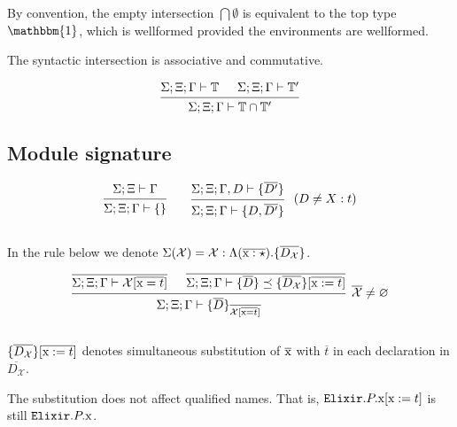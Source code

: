 \documentclass[12pt]{article}
\newcommand{\tx}{\text{\rm x}}
\newcommand{\BX}{\ensuremath{\mathcal{X}}}
\newcommand{\emptyenv}{\varnothing}
\newcommand{\Gammatop}{\ensuremath{\Xi}}
\newcommand{\Gammabot}{\ensuremath{\Gamma}}
\newcommand{\Elixir}{\texttt{Elixir}}
\begin{document}
By convention, the empty intersection $\bigcap \emptyset$ is equivalent to
the top type $\mathbbm{1}$, which is wellformed provided the environments are wellformed.

The syntactic intersection is associative and commutative.

\[
    \begin{prooftree}
        \hypo{ \Sigma; \Gammatop; \Gammabot \vdash \mathbb{T} }
        \hypo{ \Sigma; \Gammatop; \Gammabot \vdash  \mathbb{T}'  }
        \infer2{ \Sigma; \Gammatop; \Gammabot \vdash \mathbb{T} \cap \mathbb{T}' }
    \end{prooftree}
\]

\subsection{Module signature}

\[
    \begin{prooftree}
        \hypo{ \Sigma; \Gammatop \vdash \Gammabot }
        \infer1{ \Sigma; \Gammatop; \Gammabot \vdash \{ \} }
    \end{prooftree}
    \qquad
    \begin{prooftree}<
        \hypo{ \Sigma; \Gammatop; \Gammabot, D \vdash \{ \overline{D'} \} }
        \infer1[\;($ D \neq X : t$)]{ \Sigma; \Gammatop; \Gammabot \vdash \{ D, \overline{D'} \} }
    \end{prooftree}
\] \\

In the rule below we denote $\Sigma(\BX) = \BX : \Lambda (\overline{\tx : \star}). \{ \overline{D_\BX} \}$.

\[
    \begin{prooftree}
        \hypo{\overline{\Sigma; \Gammatop; \Gammabot \vdash \BX[\overline{\tx = t}]}}
        \hypo{\overline{\Sigma; \Gammatop; \Gammabot \vdash \{\overline{D}\} \preceq \{ \overline{D_\BX} \}[\overline{\tx := t}] }}
        \infer2[$\overline{\BX} \neq \emptyenv$]{ \Sigma; \Gammatop; \Gammabot \vdash  \{ \overline{D} \}_{\overline{\BX[\overline{\tx = t}]}}}
    \end{prooftree}
\] \\


$\{\overline{D_\BX} \}[\overline{\tx := t}]$ denotes simultaneous substitution of
$\overline{\tx}$ with $\overline{t}$ in each declaration in $\overline{D_\BX}$.

The substitution does not affect qualified names. That is, $\Elixir.P.\tx[\tx := t]$
is still $\Elixir.P.\tx$. \\
\end{document}
